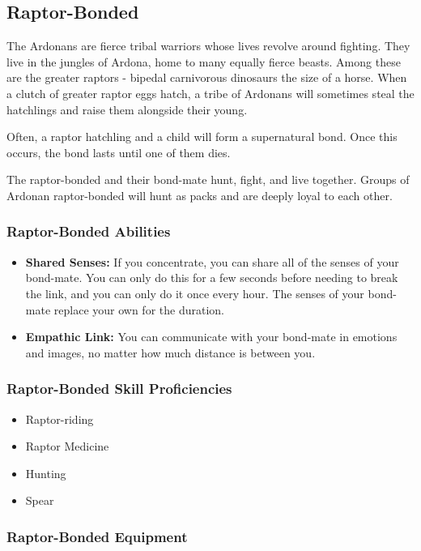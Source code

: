 \begin{multicols}{2}
\subsection{Raptor-Bonded}

The Ardonans are fierce tribal warriors whose lives revolve around
fighting. They live in the jungles of Ardona, home to many equally
fierce beasts. Among these are the greater raptors - bipedal carnivorous
dinosaurs the size of a horse. When a clutch of greater raptor eggs hatch,
a tribe of Ardonans will sometimes steal the hatchlings and raise them
alongside their young.

Often, a raptor hatchling and a child will form a supernatural bond.
Once this occurs, the bond lasts until one of them dies.

The raptor-bonded and their bond-mate hunt, fight, and live together.
Groups of Ardonan raptor-bonded will hunt as packs and are deeply loyal
to each other.

\subsubsection{Raptor-Bonded Abilities}

\begin{itemize}
  \item \textbf{Shared Senses:} If you concentrate, you can share all
    of the senses of your bond-mate. You can only do this for a few seconds
    before needing to break the link, and you can only do it once every hour.
    The senses of your bond-mate replace your own for the duration.
  \item \textbf{Empathic Link:} You can communicate with your bond-mate
    in emotions and images, no matter how much distance is between you.
\end{itemize}

\subsubsection{Raptor-Bonded Skill Proficiencies}

\begin{itemize}
  \item Raptor-riding
  \item Raptor Medicine
  \item Hunting
  \item Spear
\end{itemize}

\subsubsection{Raptor-Bonded Equipment}


\end{multicols}
